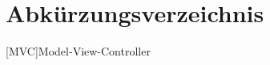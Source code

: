 \chapter*{Abkürzungsverzeichnis}
\label{abkürzungsverzeichnis}


\begin{acronym}
	[MVC]{Model-View-Controller}
\end{acronym}

